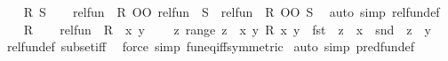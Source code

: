 \begin{isabellebody}
\isanewline
{}\isamarkupfalse%
\isanewline
\ \ \isamarkupfalse%
\ R\ S\isanewline
\ \ \isamarkupfalse%
\ {\isachardoublequoteopen}rel{\isacharunderscore}{\kern0pt}fun\ {\isacharparenleft}{\kern0pt}{\isacharequal}{\kern0pt}{\isacharparenright}{\kern0pt}\ R\ OO\ rel{\isacharunderscore}{\kern0pt}fun\ {\isacharparenleft}{\kern0pt}{\isacharequal}{\kern0pt}{\isacharparenright}{\kern0pt}\ S\ {\isasymle}\ rel{\isacharunderscore}{\kern0pt}fun\ {\isacharparenleft}{\kern0pt}{\isacharequal}{\kern0pt}{\isacharparenright}{\kern0pt}\ {\isacharparenleft}{\kern0pt}R\ OO\ S{\isacharparenright}{\kern0pt}{\isachardoublequoteclose}\ \isamarkupfalse%
\ {\isacharparenleft}{\kern0pt}auto\ simp{\isacharcolon}{\kern0pt}\ rel{\isacharunderscore}{\kern0pt}fun{\isacharunderscore}{\kern0pt}def{\isacharparenright}{\kern0pt}\isanewline
{}\isamarkupfalse%
\isanewline
\ \ \isamarkupfalse%
\ R\isanewline
\ \ \isamarkupfalse%
\ {\isachardoublequoteopen}rel{\isacharunderscore}{\kern0pt}fun\ {\isacharparenleft}{\kern0pt}{\isacharequal}{\kern0pt}{\isacharparenright}{\kern0pt}\ R\ {\isacharequal}{\kern0pt}\ {\isacharparenleft}{\kern0pt}{\isasymlambda}x\ y{\isachardot}{\kern0pt}\isanewline
\ \ \ \ {\isasymexists}z{\isachardot}{\kern0pt}\ range\ z\ {\isasymsubseteq}\ {\isacharbraceleft}{\kern0pt}{\isacharparenleft}{\kern0pt}x{\isacharcomma}{\kern0pt}\ y{\isacharparenright}{\kern0pt}{\isachardot}{\kern0pt}\ R\ x\ y{\isacharbraceright}{\kern0pt}\ {\isasymand}\ fst\ {\isasymcirc}\ z\ {\isacharequal}{\kern0pt}\ x\ {\isasymand}\ snd\ {\isasymcirc}\ z\ {\isacharequal}{\kern0pt}\ y{\isacharparenright}{\kern0pt}{\isachardoublequoteclose}\isanewline
\ \ \isamarkupfalse%
\ rel{\isacharunderscore}{\kern0pt}fun{\isacharunderscore}{\kern0pt}def\ subset{\isacharunderscore}{\kern0pt}iff\ \isamarkupfalse%
\ {\isacharparenleft}{\kern0pt}force\ simp{\isacharcolon}{\kern0pt}\ fun{\isacharunderscore}{\kern0pt}eq{\isacharunderscore}{\kern0pt}iff{\isacharbrackleft}{\kern0pt}symmetric{\isacharbrackright}{\kern0pt}{\isacharparenright}{\kern0pt}\isanewline
{}\isamarkupfalse%
\ {\isacharparenleft}{\kern0pt}auto\ simp{\isacharcolon}{\kern0pt}\ pred{\isacharunderscore}{\kern0pt}fun{\isacharunderscore}{\kern0pt}def{\isacharparenright}{\kern0pt}%
\endisatagproof
{\isafoldproof}%
%
\isadelimproof
\isanewline
%
\endisadelimproof
%
\isadelimtheory
\isanewline
%
\endisadelimtheory
%
\isatagtheory
{}\isamarkupfalse%
%
\endisatagtheory
{\isafoldtheory}%
%
\isadelimtheory
%
\endisadelimtheory
%
\end{isabellebody}%
